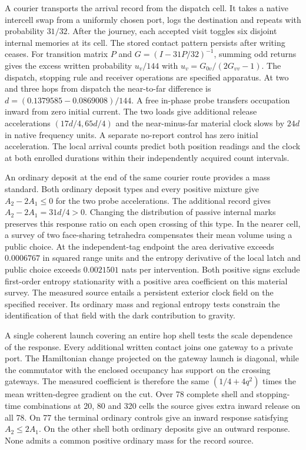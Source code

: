 \documentclass[11pt]{article}
\begin{document}
A courier transports the arrival record from the dispatch cell. It takes
a native intercell swap from a uniformly chosen port, logs the destination
and repeats with probability $31/32$. After the journey, each accepted visit
toggles six disjoint internal memories at its cell. The stored contact
pattern persists after writing ceases. For transition matrix $P$ and
$G=(I-31P/32)^{-1}$, summing odd returns gives the excess written
probability $u_v/144$ with $u_v=G_{0v}/(2G_{vv}-1)$.
The dispatch, stopping rule and receiver operations are specified apparatus.
At two and three hops from dispatch the near-to-far difference is
$d=(0.1379585-0.0869008)/144$. A free in-phase probe transfers occupation
inward from zero initial current. The two loads give additional release
accelerations $(17d/4,65d/4)$ and the near-minus-far material clock
slows by $24d$ in native frequency units. A separate no-report control
has zero initial acceleration. The local arrival counts predict both
position readings and the clock at both enrolled durations within their
independently acquired count intervals.

An ordinary deposit at the end of the same courier route provides a mass
standard. Both ordinary deposit types and every positive mixture give
$A_2-2A_1\leq0$ for the two probe accelerations. The additional record
gives $A_2-2A_1=31d/4>0$. Changing the distribution of passive internal
marks preserves this response ratio on each open crossing of this type.
In the nearer cell, a survey of two face-sharing tetrahedra compensates
their mean volume using a public choice. At the independent-tag endpoint
the area derivative exceeds $0.0006767$ in squared range units and the
entropy derivative of the local latch and public choice exceeds $0.0021501$
nats per intervention. Both positive signs exclude first-order entropy
stationarity with a positive area coefficient on this material survey.
The measured source entails a persistent exterior clock field on the
specified receiver. Its ordinary mass and regional entropy tests constrain
the identification of that field with the dark contribution to gravity.

A single coherent launch covering an entire hop shell tests the scale
dependence of the response. Every additional written contact joins one
gateway to a private port. The Hamiltonian change projected on the gateway
launch is diagonal, while the commutator with the enclosed occupancy
has support on the crossing gateways. The measured coefficient is therefore
the same $(1/4+4q^2)$ times the mean written-degree gradient on the cut.
Over 78 complete shell and stopping-time combinations at 20, 80 and 320
cells the source gives extra inward release on all 78. On 77 the terminal
ordinary controls give an inward response satisfying $A_2\le2A_1$.
On the other shell both ordinary deposits give an outward response.
None admits a common positive ordinary mass for the record source.
\end{document}
